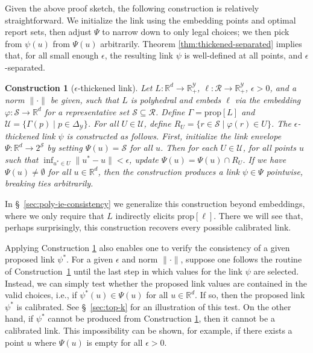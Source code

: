 \documentclass[twoside,11pt]{article}
\newcommand{\reals}{\mathbb{R}}
\newcommand{\prop}[1]{\mathrm{prop}[#1]}
\newcommand{\simplex}{\Delta_\Y}
\newcommand{\R}{\mathcal{R}}
\newcommand{\Sc}{\mathcal{S}}
\newcommand{\U}{\mathcal{U}}
\newcommand{\Y}{\mathcal{Y}}
\newtheorem{construction}{Construction}
\begin{document}
Given the above proof sketch, the following construction is relatively straightforward.
We initialize the link using the embedding points and optimal report sets, then adjust $\Psi$ to narrow down to only legal choices; we then pick from $\psi(u)$ from $\Psi(u)$ arbitrarily.
Theorem \ref{thm:thickened-separated} implies that, for all small enough $\epsilon$, the resulting link $\psi$ is well-defined at all points, and $\epsilon$-separated.
\begin{construction}[$\epsilon$-thickened link] \label{const:eps-thick-link}
  Let $L:\reals^d\to\reals^\Y_+$, $\ell:\R\to\reals^\Y_+$, $\epsilon > 0$, and a norm $\|\cdot\|$ be given, such that $L$ is polyhedral and embeds $\ell$ via the embedding $\varphi: \Sc \to \reals^d$ for a representative set $\Sc\subseteq\R$.
  Define $\Gamma = \prop L$ and $\U = \{\Gamma(p) \mid p \in \simplex\}$.
  For all $U \in \U$, define $R_U = \{r \in \Sc \mid \varphi(r) \in U\}$.
  The \emph{$\epsilon$-thickened link} $\psi$ is constructed as follows.
  First, initialize the \emph{link envelope} $\Psi: \reals^d \to 2^{\Sc}$ by setting $\Psi(u) = \Sc$ for all $u$.
  Then for each $U \in \U$, for all points $u$ such that $\inf_{u^* \in U} \|u^*-u\| < \epsilon$, update $\Psi(u) = \Psi(u) \cap R_U$.
  If we have $\Psi(u)\neq\emptyset$ for all $u\in\reals^d$, then the construction \emph{produces a link} $\psi \in \Psi$ pointwise, breaking ties arbitrarily.
\end{construction}
In \S~\ref{sec:poly-ie-consistency} we generalize this construction beyond embeddings, where we only require that $L$ indirectly elicits $\prop\ell$.
There we will see that, perhaps surprisingly, this construction recovers every possible calibrated link.

Applying Construction \ref{const:eps-thick-link} also enables one to verify the consistency of a given proposed link $\psi^*$.
For a given $\epsilon$ and norm $\|\cdot\|$, suppose one follows the routine of Construction~\ref{const:eps-thick-link} until the last step in which values for the link $\psi$ are selected.
Instead, we can simply test whether the proposed link values are contained in the valid choices, i.e., if $\psi^*(u) \in \Psi(u)$ for all $u\in\reals^d$.
If so, then the proposed link $\psi^*$ is calibrated.
See \S~\ref{sec:top-k} for an illustration of this test.
On the other hand, if $\psi^*$ cannot be produced from Construction \ref{const:eps-thick-link}, then it cannot be a calibrated link.
This impossibility can be shown, for example, if there exists a point $u$ where $\Psi(u)$ is empty for all $\epsilon > 0$.
\end{document}
